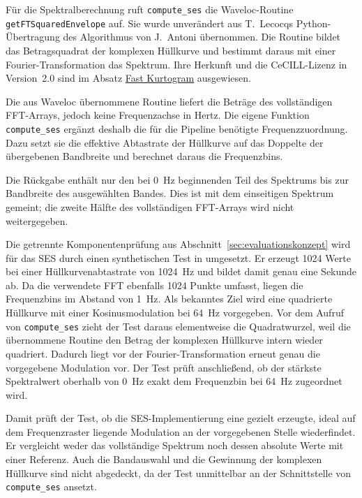 Für die Spektralberechnung ruft \texttt{compute\_ses} die Waveloc-Routine
\texttt{getFTSquaredEnvelope} auf. Sie wurde unverändert aus T.~Lecocqs
Python-Übertragung des Algorithmus von J.~Antoni übernommen. Die Routine
bildet das Betragsquadrat der komplexen Hüllkurve und bestimmt daraus mit
einer Fourier-Transformation das Spektrum.
Ihre Herkunft und die CeCILL-Lizenz in Version~2.0 sind im Absatz
\hyperref[subsec:fast_kurtogram_impl]{Fast Kurtogram} ausgewiesen.

Die aus Waveloc übernommene Routine liefert die Beträge des vollständigen
FFT-Arrays, jedoch keine Frequenzachse in Hertz. Die eigene Funktion
\texttt{compute\_ses} ergänzt deshalb die für die Pipeline benötigte
Frequenzzuordnung. Dazu setzt sie die effektive Abtastrate der Hüllkurve auf
das Doppelte der übergebenen Bandbreite und berechnet daraus die
Frequenzbins.

Die Rückgabe enthält nur den bei 0~Hz beginnenden Teil des Spektrums bis zur
Bandbreite des ausgewählten Bandes. Dies ist mit dem einseitigen Spektrum
gemeint; die zweite Hälfte des vollständigen FFT-Arrays wird nicht
weitergegeben.

Die getrennte Komponentenprüfung aus
Abschnitt~\ref{sec:evaluationskonzept} wird für das SES durch einen
synthetischen Test in  umgesetzt. Er erzeugt 1024
Werte bei einer Hüllkurvenabtastrate von 1024~Hz und bildet damit genau eine
Sekunde ab. Da die verwendete FFT ebenfalls 1024 Punkte umfasst, liegen die
Frequenzbins im Abstand von 1~Hz. Als bekanntes Ziel wird eine
quadrierte Hüllkurve mit einer Kosinusmodulation bei 64~Hz vorgegeben. Vor
dem Aufruf von \texttt{compute\_ses} zieht der Test daraus elementweise die
Quadratwurzel, weil die übernommene Routine den Betrag der komplexen
Hüllkurve intern wieder quadriert. Dadurch liegt vor der
Fourier-Transformation erneut genau die vorgegebene Modulation vor. Der
Test prüft anschließend, ob der stärkste Spektralwert oberhalb von 0~Hz
exakt dem Frequenzbin bei 64~Hz zugeordnet wird.

Damit prüft der Test, ob die SES-Implementierung eine gezielt erzeugte,
ideal auf dem Frequenzraster liegende Modulation an der vorgegebenen Stelle
wiederfindet. Er vergleicht weder das vollständige Spektrum noch dessen
absolute Werte mit einer Referenz. Auch die Bandauswahl und die Gewinnung
der komplexen Hüllkurve sind nicht abgedeckt, da der Test unmittelbar an
der Schnittstelle von \texttt{compute\_ses} ansetzt.

